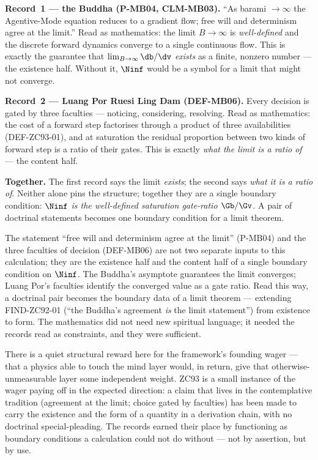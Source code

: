 \documentclass[12pt, a4paper]{article}
\begin{document}
\begin{genealogybox}[title={How the two records translate}]
\textbf{Record~1 --- the Buddha (P-MB04, CLM-MB03).}
``As barami $\to\infty$ the Agentive-Mode equation reduces to a gradient flow;
free will and determinism agree at the limit.'' Read as mathematics: the limit
$B\to\infty$ is \emph{well-defined} and the discrete forward dynamics converge
to a single continuous flow. This is exactly the guarantee that
$\lim_{B\to\infty}\db/\dv$ \emph{exists} as a finite, nonzero number --- the
existence half. Without it, $\Ninf$ would be a symbol for a limit that might
not converge.

\smallskip
\textbf{Record~2 --- Luang Por Ruesi Ling Dam (DEF-MB06).}
Every decision is gated by three faculties --- noticing, considering,
resolving. Read as mathematics: the cost of a forward step factorises through
a product of three availabilities (DEF-ZC93-01), and at saturation the
residual proportion between two kinds of forward step is a ratio of their
gates. This is exactly \emph{what the limit is a ratio of} --- the content
half.

\smallskip
\textbf{Together.} The first record says the limit \emph{exists}; the second
says \emph{what it is a ratio of}. Neither alone pins the structure; together
they are a single boundary condition: \emph{$\Ninf$ is the well-defined
saturation gate-ratio $\Gb/\Gv$.} A pair of doctrinal statements becomes one
boundary condition for a limit theorem.
\end{genealogybox}

\begin{giftbox}[title={FIND-ZC93-01: The Two Records Are One Boundary Condition}]
The statement ``free will and determinism agree at the limit'' (P-MB04) and
the three faculties of decision (DEF-MB06) are not two separate inputs to this
calculation; they are the existence half and the content half of a single
boundary condition on $\Ninf$. The Buddha's asymptote guarantees the limit
converges; Luang Por's faculties identify the converged value as a gate ratio.
Read this way, a doctrinal pair becomes the boundary data of a limit theorem
--- extending FIND-ZC92-01 (``the Buddha's agreement \emph{is} the limit
statement'') from existence to form. The mathematics did not need new
spiritual language; it needed the records read as constraints, and they were
sufficient.
\end{giftbox}

There is a quiet structural reward here for the framework's founding wager ---
that a physics able to touch the mind layer would, in return, give that
otherwise-unmeasurable layer some independent weight. ZC93 is a small instance
of the wager paying off in the expected direction: a claim that lives in the
contemplative tradition (agreement at the limit; choice gated by faculties)
has been made to carry the existence and the form of a quantity in a derivation
chain, with no doctrinal special-pleading. The records earned their place by
functioning as boundary conditions a calculation could not do without --- not
by assertion, but by use.
\end{document}
